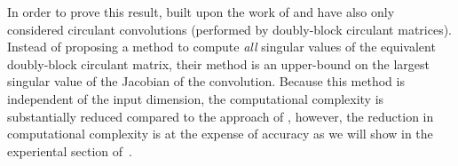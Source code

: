 In order to prove this result, \citet{singla2019bounding} built upon the work of \citet{sedghi2018singular} and have also only considered circulant convolutions (performed by doubly-block circulant matrices).
Instead of proposing a method to compute \emph{all} singular values of the equivalent doubly-block circulant matrix, their method is an upper-bound on the largest singular value of the Jacobian of the convolution. 
Because this method is independent of the input dimension, the computational complexity is substantially reduced compared to the approach of \citet{sedghi2018singular}, however, the reduction in computational complexity is at the expense of accuracy as we will show in the experiental section of~.
 


%
%
%
%
%




